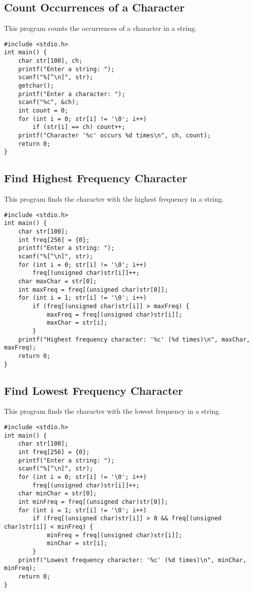 \documentclass[a4paper,12pt]{article}
\begin{document}
\subsection{Count Occurrences of a Character}
This program counts the occurrences of a character in a string.
\begin{lstlisting}[caption={Count Occurrences of a Character}]
#include <stdio.h>
int main() {
    char str[100], ch;
    printf("Enter a string: ");
    scanf("%[^\n]", str);
    getchar();
    printf("Enter a character: ");
    scanf("%c", &ch);
    int count = 0;
    for (int i = 0; str[i] != '\0'; i++)
        if (str[i] == ch) count++;
    printf("Character '%c' occurs %d times\n", ch, count);
    return 0;
}
\end{lstlisting}
\clearpage

\subsection{Find Highest Frequency Character}
This program finds the character with the highest frequency in a string.
\begin{lstlisting}[caption={Find Highest Frequency Character}]
#include <stdio.h>
int main() {
    char str[100];
    int freq[256] = {0};
    printf("Enter a string: ");
    scanf("%[^\n]", str);
    for (int i = 0; str[i] != '\0'; i++)
        freq[(unsigned char)str[i]]++;
    char maxChar = str[0];
    int maxFreq = freq[(unsigned char)str[0]];
    for (int i = 1; str[i] != '\0'; i++)
        if (freq[(unsigned char)str[i]] > maxFreq) {
            maxFreq = freq[(unsigned char)str[i]];
            maxChar = str[i];
        }
    printf("Highest frequency character: '%c' (%d times)\n", maxChar, maxFreq);
    return 0;
}
\end{lstlisting}
\clearpage

\subsection{Find Lowest Frequency Character}
This program finds the character with the lowest frequency in a string.
\begin{lstlisting}[caption={Find Lowest Frequency Character}]
#include <stdio.h>
int main() {
    char str[100];
    int freq[256] = {0};
    printf("Enter a string: ");
    scanf("%[^\n]", str);
    for (int i = 0; str[i] != '\0'; i++)
        freq[(unsigned char)str[i]]++;
    char minChar = str[0];
    int minFreq = freq[(unsigned char)str[0]];
    for (int i = 1; str[i] != '\0'; i++)
        if (freq[(unsigned char)str[i]] > 0 && freq[(unsigned char)str[i]] < minFreq) {
            minFreq = freq[(unsigned char)str[i]];
            minChar = str[i];
        }
    printf("Lowest frequency character: '%c' (%d times)\n", minChar, minFreq);
    return 0;
}
\end{lstlisting}
\clearpage
\end{document}
